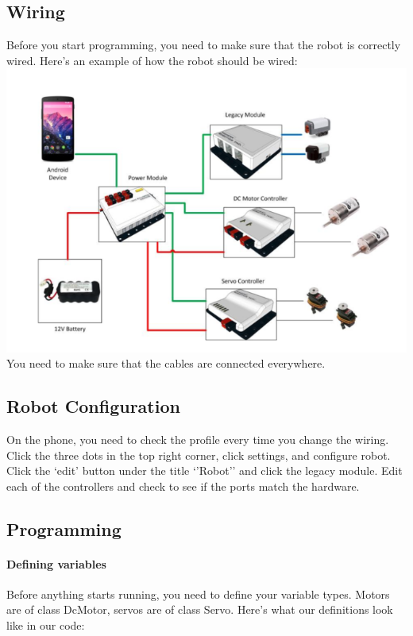 \documentclass[12p,a4paper]{article}
\begin{document}
\subsection{Wiring}

Before you start programming, you need to make sure that the robot is correctly wired. Here's an example of how the robot should be wired:\\
\includegraphics[scale=0.3]{robot-wiring}\\
You need to make sure that the cables are connected everywhere.

\subsection{Robot Configuration}

On the phone, you need to check the profile every time you change the wiring. Click the three dots in the top right corner, click settings, and configure robot. Click the `edit' button under the title `'Robot'' and click the legacy module. Edit each of the controllers and check to see if the ports match the hardware.
\subsection{Programming}

\paragraph{Defining variables}Before anything starts running, you need to define your variable types. Motors are of class DcMotor, servos are of class Servo. Here's what our definitions look like in our code:
\end{document}
